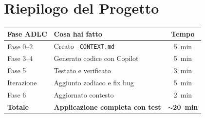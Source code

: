 \section*{Riepilogo del Progetto}

\begin{center}
\begin{tabularx}{\textwidth}{l X c}
\toprule
\textbf{Fase ADLC} & \textbf{Cosa hai fatto} & \textbf{Tempo} \\
\midrule
Fase 0--2 & Creato \texttt{\_CONTEXT.md} & 5~min \\
Fase 3--4 & Generato codice con Copilot & 5~min \\
Fase 5 & Testato e verificato & 3~min \\
Iterazione & Aggiunto zodiaco e fix bug & 5~min \\
Fase 6 & Aggiornato contesto & 2~min \\
\midrule
\textbf{Totale} & \textbf{Applicazione completa con test} & \textbf{$\sim$20~min} \\
\bottomrule
\end{tabularx}
\end{center}
